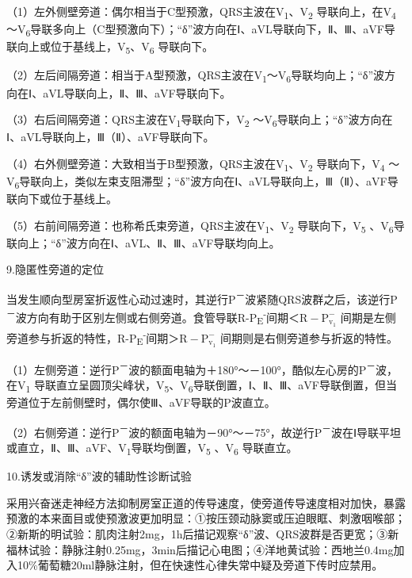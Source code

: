 （1）左外侧壁旁道：偶尔相当于C型预激，QRS主波在V\textsubscript{1}、V\textsubscript{2} 导联向上，在V\textsubscript{4} ～V\textsubscript{6}导联多向上（C型预激向下）；“δ”波方向在Ⅰ、aVL导联向下，Ⅱ、Ⅲ、aVF导联向上或位于基线上，V\textsubscript{5}、V\textsubscript{6} 导联向下。

（2）左后间隔旁道：相当于A型预激，QRS主波在V\textsubscript{1}～V\textsubscript{6}导联均向上；“δ”波方向在Ⅰ、aVL导联向上，Ⅱ、Ⅲ、aVF导联向下。

（3）右后间隔旁道：QRS主波在V\textsubscript{1}导联向下，V\textsubscript{2} ～V\textsubscript{6}导联向上；“δ”波方向在Ⅰ、aVL导联向上，Ⅲ（Ⅱ）、aVF导联向下。

（4）右外侧壁旁道：大致相当于B型预激，QRS主波在V\textsubscript{1}、V\textsubscript{2} 导联向下，V\textsubscript{4} ～V\textsubscript{6}导联向上，类似左束支阻滞型；“δ”波方向在Ⅰ、aVL导联向上，Ⅲ（Ⅱ）、aVF导联向下或位于基线上。

（5）右前间隔旁道：也称希氏束旁道，QRS主波在V\textsubscript{1}、V\textsubscript{2} 导联向下，V\textsubscript{5} 、V\textsubscript{6}导联向上；“δ”波方向在Ⅰ、aVL、Ⅱ、Ⅲ、aVF导联均向上。

9.隐匿性旁道的定位

当发生顺向型房室折返性心动过速时，其逆行P\textsuperscript{－}波紧随QRS波群之后，该逆行P\textsuperscript{－}波方向有助于区别左侧或右侧旁道。食管导联R-P\textsubscript{E}\textsuperscript{-}间期＜$\text{R}-\text{P}_{\text{v}_1}^-$
间期是左侧旁道参与折返的特性，R-P\textsubscript{E}\textsuperscript{-}间期＞$\text{R}-\text{P}_{\text{v}_1}^-$
间期则是右侧旁道参与折返的特性。

（1）左侧旁道：逆行P\textsuperscript{－}波的额面电轴为＋180°～－100°，酷似左心房的P\textsuperscript{－}波，在V\textsubscript{1} 导联直立呈圆顶尖峰状，V\textsubscript{5}、V\textsubscript{6}导联倒置，Ⅰ、Ⅱ、Ⅲ、aVF导联倒置，但当旁道位于左前侧壁时，偶尔使Ⅲ、aVF导联的P波直立。

（2）右侧旁道：逆行P\textsuperscript{－}波的额面电轴为－90°～－75°，故逆行P\textsuperscript{－}波在Ⅰ导联平坦或直立，Ⅱ、Ⅲ、aVF、V\textsubscript{1}导联均倒置，V\textsubscript{5} 、V\textsubscript{6} 导联直立。

10.诱发或消除“δ”波的辅助性诊断试验

采用兴奋迷走神经方法抑制房室正道的传导速度，使旁道传导速度相对加快，暴露预激的本来面目或使预激波更加明显：①按压颈动脉窦或压迫眼眶、刺激咽喉部；②新斯的明试验：肌肉注射2mg，1h后描记观察“δ”波、QRS波群是否更宽；③新福林试验：静脉注射0.25mg，3min后描记心电图；④洋地黄试验：西地兰0.4mg加入10\%葡萄糖20ml静脉注射，但在快速性心律失常中疑及旁道下传时应禁用。

